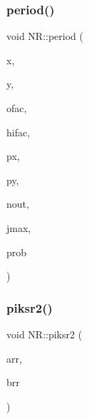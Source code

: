 \mbox{\label{namespaceNR_aed0c7ecfa8b01342146d1d0dff6befca}} 
\subsubsection{\texorpdfstring{period()}{period()}}
{\footnotesize\ttfamily void N\+R\+::period (\begin{DoxyParamCaption}\item[{\mbox{\hyperlink{namespaceNR_a9f943da53862537c552e2a770cb170ae}{Vec\+\_\+\+I\+\_\+\+DP}} \&}]{x,  }\item[{\mbox{\hyperlink{namespaceNR_a9f943da53862537c552e2a770cb170ae}{Vec\+\_\+\+I\+\_\+\+DP}} \&}]{y,  }\item[{const \mbox{\hyperlink{namespaceNR_af6ff762dd605ff477b8e52387253a02a}{DP}}}]{ofac,  }\item[{const \mbox{\hyperlink{namespaceNR_af6ff762dd605ff477b8e52387253a02a}{DP}}}]{hifac,  }\item[{\mbox{\hyperlink{namespaceNR_a970094d23441f8ef6a45282a7eb2103d}{Vec\+\_\+\+O\+\_\+\+DP}} \&}]{px,  }\item[{\mbox{\hyperlink{namespaceNR_a970094d23441f8ef6a45282a7eb2103d}{Vec\+\_\+\+O\+\_\+\+DP}} \&}]{py,  }\item[{int \&}]{nout,  }\item[{int \&}]{jmax,  }\item[{\mbox{\hyperlink{namespaceNR_af6ff762dd605ff477b8e52387253a02a}{DP}} \&}]{prob }\end{DoxyParamCaption})}

\mbox{\label{namespaceNR_ab0ef3238c95aeadb917a97ef14a41b29}} 
\subsubsection{\texorpdfstring{piksr2()}{piksr2()}}
{\footnotesize\ttfamily void N\+R\+::piksr2 (\begin{DoxyParamCaption}\item[{\mbox{\hyperlink{namespaceNR_ab293e06a6bf799d8a7ed932b6852bcb8}{Vec\+\_\+\+I\+O\+\_\+\+DP}} \&}]{arr,  }\item[{\mbox{\hyperlink{namespaceNR_ab293e06a6bf799d8a7ed932b6852bcb8}{Vec\+\_\+\+I\+O\+\_\+\+DP}} \&}]{brr }\end{DoxyParamCaption})}

